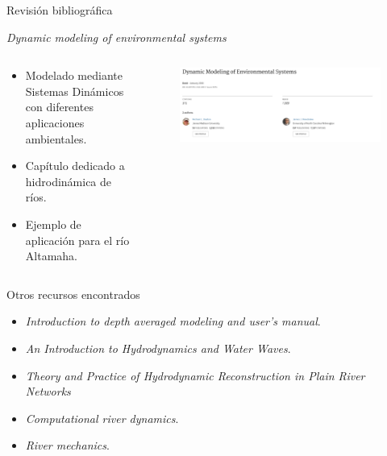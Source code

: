 \documentclass[17pt, t, lualatex]{beamer}
\begin{document}
\begin{frame}{Revisión bibliográfica}

  \begin{block}{\textit{Dynamic modeling of environmental systems}\cite{deaton1999dynamic}}
  \end{block}

\begin{columns}
  \begin{column}{.5\textwidth}
    \begin{itemize}
      \item Modelado mediante Sistemas Dinámicos con diferentes aplicaciones ambientales.
      \item Capítulo dedicado a hidrodinámica de ríos.
      \item Ejemplo de aplicación para el río Altamaha.
\end{itemize}
  \end{column}

  \begin{column}{.5\textwidth}
    \begin{figure}[ht]
      \centering
      \includegraphics[width=1\textwidth]{img/5.png}
    \end{figure}
  \end{column}
\end{columns}

\end{frame}

\begin{frame}{Otros recursos encontrados}

\begin{itemize}
  \item \textit{Introduction to depth averaged modeling and user's manual}\cite{steffler2002introduction}.
  \item \textit{An Introduction to Hydrodynamics and Water Waves}\cite{le2013introduction}.
  \item \textit{Theory and Practice of Hydrodynamic Reconstruction in Plain River
Networks}
  \item \textit{Computational river dynamics}\cite{wu2007computational}.
  \item \textit{River mechanics}\cite{julien2018river}.
\end{itemize}

\end{frame}
\end{document}
